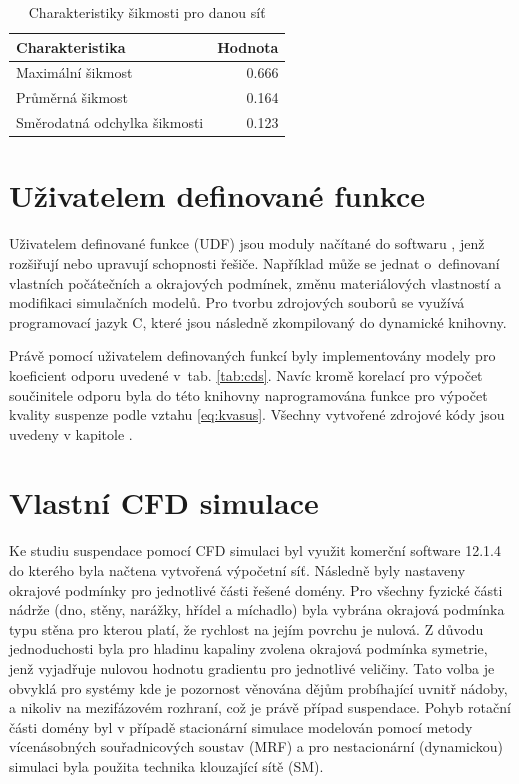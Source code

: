 \begin{table}[h!]
\centering
\caption{Charakteristiky šikmosti pro danou síť}
\label{tab:skw_tab}
\begin{tabular}{lr}
\toprule
\textbf{Charakteristika} & \textbf{Hodnota} \\
\midrule

Maximální šikmost & \num{0.666} \\
Průměrná šikmost & \num{0.164} \\
Směrodatná odchylka šikmosti & \num{0.123} \\

\bottomrule
\end{tabular}
\end{table}

\section{Uživatelem definované funkce}
Uživatelem definované funkce (UDF) jsou moduly načítané do softwaru \flu, jenž rozšiřují nebo upravují schopnosti řešiče. Například může se jednat o~definovaní vlastních počátečních a okrajových podmínek, změnu materiálových vlastností a modifikaci simulačních modelů. Pro tvorbu zdrojových souborů se využívá programovací jazyk C, které jsou následně zkompilovaný do dynamické knihovny.

Právě pomocí uživatelem definovaných funkcí byly implementovány modely pro koeficient odporu uvedené v~tab. \ref{tab:cds}. Navíc kromě korelací pro výpočet součinitele odporu byla do této knihovny naprogramována funkce pro výpočet kvality suspenze podle vztahu \ref{eq:kvasus}. Všechny vytvořené zdrojové kódy jsou uvedeny v kapitole .

\section{Vlastní CFD simulace}
Ke studiu suspendace pomocí CFD simulaci byl využit komerční software \flu{} 12.1.4 do kterého byla načtena vytvořená výpočetní síť. Následně byly nastaveny okrajové podmínky pro jednotlivé části řešené domény. Pro všechny fyzické části nádrže (dno, stěny, narážky, hřídel a míchadlo) byla vybrána okrajová podmínka typu stěna pro kterou platí, že rychlost na jejím povrchu je nulová. Z důvodu jednoduchosti byla pro hladinu kapaliny zvolena okrajová podmínka symetrie, jenž vyjadřuje nulovou hodnotu gradientu pro jednotlivé veličiny. Tato volba je obvyklá pro systémy kde je pozornost věnována dějům probíhající uvnitř nádoby, a nikoliv na mezifázovém rozhraní, což je právě případ suspendace. Pohyb rotační části domény byl v případě stacionární simulace modelován pomocí metody vícenásobných souřadnicových soustav (MRF) a pro nestacionární (dynamickou) simulaci byla použita technika klouzající sítě (SM). 

